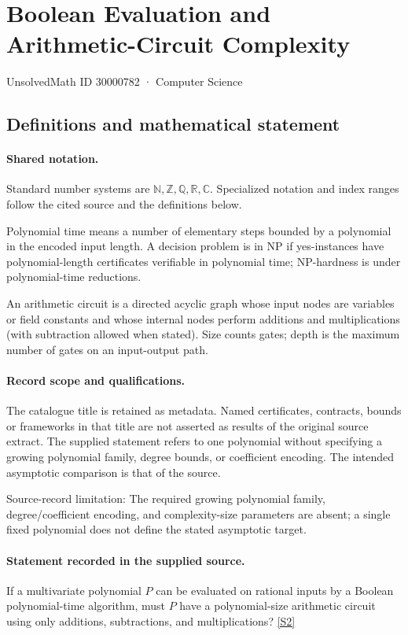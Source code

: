 \documentclass[11pt]{article}
\newcommand{\sref}[2]{\hyperlink{source:#1:#2}{[S#2]}}
\begin{document}
\setcounter{section}{30000781}
\section{Boolean Evaluation and Arithmetic-Circuit Complexity}\label{30000782}
{\small\sffamily UnsolvedMath ID 30000782 · Computer Science}
\subsection{Definitions and mathematical statement}

\paragraph{Shared notation.}Standard number systems are $\mathbb N,\mathbb Z,\mathbb Q,\mathbb R,\mathbb C$. Specialized notation and index ranges follow the cited source and the definitions below.


Polynomial time means a number of elementary steps bounded by a polynomial in the encoded input length. A decision problem is in $\mathrm{NP}$ if yes-instances have polynomial-length certificates verifiable in polynomial time; NP-hardness is under polynomial-time reductions.

An arithmetic circuit is a directed acyclic graph whose input nodes are variables or field constants and whose internal nodes perform additions and multiplications (with subtraction allowed when stated). Size counts gates; depth is the maximum number of gates on an input-output path.
\paragraph{Record scope and qualifications.}
The catalogue title is retained as metadata. Named certificates, contracts, bounds or frameworks in that title are not asserted as results of the original source extract.
The supplied statement refers to one polynomial without specifying a growing polynomial family, degree bounds, or coefficient encoding. The intended asymptotic comparison is that of the source.

Source-record limitation: The required growing polynomial family, degree/coefficient encoding, and complexity-size parameters are absent; a single fixed polynomial does not define the stated asymptotic target.
\paragraph{Statement recorded in the supplied source.}
If a multivariate polynomial $P$ can be evaluated on rational inputs by a Boolean polynomial-time algorithm, must $P$ have a polynomial-size arithmetic circuit using only additions, subtractions, and multiplications? \sref{30000782}{2}
\end{document}
